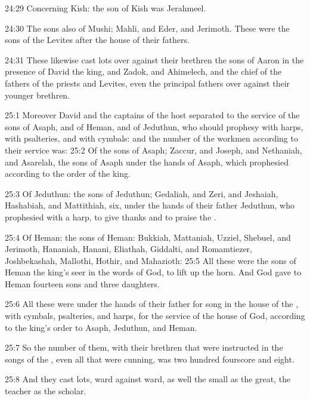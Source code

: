 24:29 Concerning Kish: the son of Kish was Jerahmeel.

24:30 The sons also of Mushi; Mahli, and Eder, and Jerimoth. These
were the sons of the Levites after the house of their fathers.

24:31 These likewise cast lots over against their brethren the sons of
Aaron in the presence of David the king, and Zadok, and Ahimelech, and
the chief of the fathers of the priests and Levites, even the
principal fathers over against their younger brethren.

25:1 Moreover David and the captains of the host separated to the
service of the sons of Asaph, and of Heman, and of Jeduthun, who
should prophesy with harps, with psalteries, and with cymbals: and the
number of the workmen according to their service was: 25:2 Of the sons
of Asaph; Zaccur, and Joseph, and Nethaniah, and Asarelah, the sons of
Asaph under the hands of Asaph, which prophesied according to the
order of the king.

25:3 Of Jeduthun: the sons of Jeduthun; Gedaliah, and Zeri, and
Jeshaiah, Hashabiah, and Mattithiah, six, under the hands of their
father Jeduthun, who prophesied with a harp, to give thanks and to
praise the \LORD.

25:4 Of Heman: the sons of Heman: Bukkiah, Mattaniah, Uzziel, Shebuel,
and Jerimoth, Hananiah, Hanani, Eliathah, Giddalti, and Romamtiezer,
Joshbekashah, Mallothi, Hothir, and Mahazioth: 25:5 All these were the
sons of Heman the king's seer in the words of God, to lift up the
horn. And God gave to Heman fourteen sons and three daughters.

25:6 All these were under the hands of their father for song in the
house of the \LORD, with cymbals, psalteries, and harps, for the
service of the house of God, according to the king's order to Asaph,
Jeduthun, and Heman.

25:7 So the number of them, with their brethren that were instructed
in the songs of the \LORD, even all that were cunning, was two hundred
fourscore and eight.

25:8 And they cast lots, ward against ward, as well the small as the
great, the teacher as the scholar.

